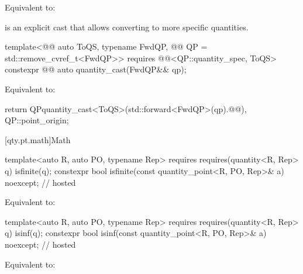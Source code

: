 \begin{itemdescr}
\pnum
\effects
Equivalent to:
\end{itemdescr}

\pnum
{} is an explicit cast that allows converting to more specific quantities.

\begin{itemdecl}
template<@@ auto ToQS, typename FwdQP, @@ QP = std::remove_cvref_t<FwdQP>>
  requires @@<QP::quantity_spec, ToQS>
constexpr @@ auto quantity_cast(FwdQP&& qp);
\end{itemdecl}

\begin{itemdescr}
\pnum
\effects
Equivalent to:
\begin{codeblock}
return QP{quantity_cast<ToQS>(std::forward<FwdQP>(qp).@@),
          QP::point_origin};
\end{codeblock}
\end{itemdescr}

[qty.pt.math]{Math}

\begin{itemdecl}
template<auto R, auto PO, typename Rep>
  requires requires(quantity<R, Rep> q) { isfinite(q); }
constexpr bool isfinite(const quantity_point<R, PO, Rep>& a) noexcept;                  // hosted
\end{itemdecl}

\begin{itemdescr}
\pnum
\effects
Equivalent to:
\end{itemdescr}

\begin{itemdecl}
template<auto R, auto PO, typename Rep>
  requires requires(quantity<R, Rep> q) { isinf(q); }
constexpr bool isinf(const quantity_point<R, PO, Rep>& a) noexcept;                     // hosted
\end{itemdecl}

\begin{itemdescr}
\pnum
\effects
Equivalent to:
\end{itemdescr}

